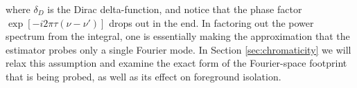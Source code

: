 \documentclass[twocolumn,apj,numberedappendix]{emulateapj}
\renewcommand\[{\begin{equation}}
\renewcommand\]{\end{equation}}
\begin{document}
where $\delta_D$ is the Dirac delta-function, and notice that the phase factor $\exp\left[-i2\pi\tau\left(\nu-\nu'\right)\right]$
drops out in the end. In factoring out the power spectrum from the integral, one is essentially making the approximation that the estimator probes only a single Fourier mode. In Section \ref{sec:chromaticity} we will relax this assumption and examine the exact form of the Fourier-space footprint that is being probed, as well as its effect on foreground isolation.  

%
%
%
\end{document}
